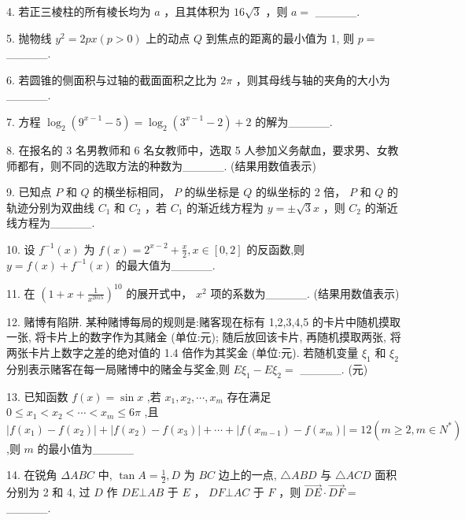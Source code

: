 \documentclass[10pt]{article}
\begin{document}
4. 若正三棱柱的所有棱长均为 \(a\) ，且其体积为 \({16}\sqrt{3}\) ，则 \(a =\) \_\_\_\_\_.

5. 抛物线 \({y}^{2} = {2px}\left( {p > 0}\right)\) 上的动点 \(Q\) 到焦点的距离的最小值为 1, 则 \(p =\) \_\_\_\_\_.

6. 若圆锥的侧面积与过轴的截面面积之比为 \({2\pi }\) ，则其母线与轴的夹角的大小为\_\_\_\_\_.

7. 方程 \({\log }_{2}\left( {{9}^{x - 1} - 5}\right)  = {\log }_{2}\left( {{3}^{x - 1} - 2}\right)  + 2\) 的解为\_\_\_\_\_.

8. 在报名的 3 名男教师和 6 名女教师中，选取 5 人参加义务献血，要求男、女教师都有，则不同的选取方法的种数为\_\_\_\_\_. (结果用数值表示)

9. 已知点 \(P\) 和 \(Q\) 的横坐标相同， \(P\) 的纵坐标是 \(Q\) 的纵坐标的 2 倍， \(P\) 和 \(Q\) 的轨迹分别为双曲线 \({C}_{1}\) 和 \({C}_{2}\) ，若 \({C}_{1}\) 的渐近线方程为 \(y =  \pm  \sqrt{3}x\) ，则 \({C}_{2}\) 的渐近线方程为\_\_\_\_\_.

10. 设 \({f}^{-1}\left( x\right)\) 为 \(f\left( x\right)  = {2}^{x - 2} + \frac{x}{2},x \in  \left\lbrack  {0,2}\right\rbrack\) 的反函数,则 \(y = f\left( x\right)  + {f}^{-1}\left( x\right)\) 的最大值为\_\_\_\_\_.

11. 在 \({\left( 1 + x + \frac{1}{{x}^{2015}}\right) }^{10}\) 的展开式中， \({x}^{2}\) 项的系数为\_\_\_\_\_. (结果用数值表示)

12. 赌博有陷阱. 某种赌博每局的规则是:赌客现在标有 1,2,3,4,5 的卡片中随机摸取一张, 将卡片上的数字作为其赌金 (单位:元); 随后放回该卡片, 再随机摸取两张, 将两张卡片上数字之差的绝对值的 1.4 倍作为其奖金 (单位:元). 若随机变量 \({\xi }_{1}\) 和 \({\xi }_{2}\) 分别表示赌客在每一局赌博中的赌金与奖金,则 \(E{\xi }_{1} - E{\xi }_{2} =\) \_\_\_\_\_. (元)

13. 已知函数 \(f\left( x\right)  = \sin x\) ,若 \({x}_{1},{x}_{2},\cdots ,{x}_{m}\) 存在满足 \(0 \leq  {x}_{1} < {x}_{2} < \cdots  < {x}_{m} \leq  {6\pi }\) ,且 \(\left| {f\left( {x}_{1}\right)  - f\left( {x}_{2}\right) }\right|  + \left| {f\left( {x}_{2}\right)  - f\left( {x}_{3}\right) }\right|  + \cdots  + \left| {f\left( {x}_{m - 1}\right)  - f\left( {x}_{m}\right) }\right|  = {12}\left( {m \geq  2,m \in  {N}^{ * }}\right)\) ,则 \(m\) 的最小值为\_\_\_\_\_

14. 在锐角 \({\Delta ABC}\) 中, \(\tan A = \frac{1}{2},D\) 为 \({BC}\) 边上的一点, \(\bigtriangleup {ABD}\) 与 \(\bigtriangleup {ACD}\) 面积分别为 2 和 4, 过 \(D\) 作 \({DE} \bot  {AB}\) 于 \(E\) ， \({DF} \bot  {AC}\) 于 \(F\) ，则 \(\overrightarrow{DE} \cdot  \overrightarrow{DF} =\) \_\_\_\_\_.
\end{document}
